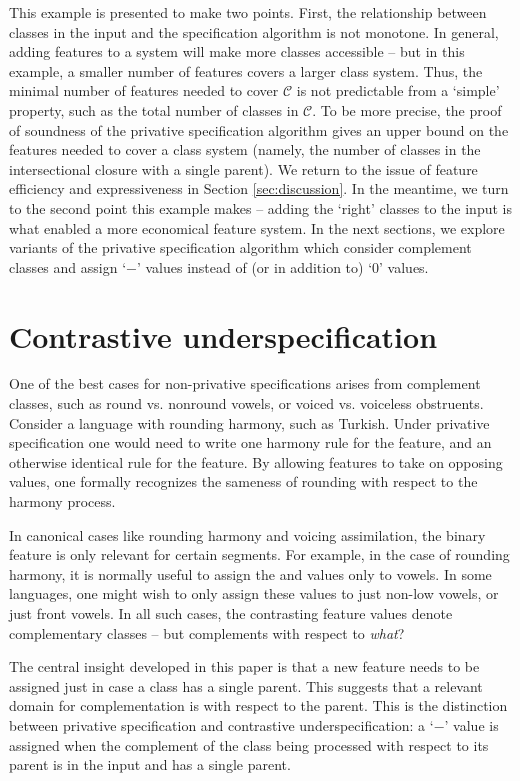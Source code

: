 \documentclass[11pt, oneside]{article}   	%
\begin{document}
This example is presented to make two points. First, the relationship between classes in the input and the specification algorithm is not monotone. In general, adding features to a system will make more classes accessible -- but in this example, a smaller number of features covers a larger class system. Thus, the minimal number of features needed to cover $\mathcal C$ is not predictable from a `simple' property, such as the total number of classes in $\mathcal C$. To be more precise, the proof of soundness of the privative specification algorithm gives an upper bound on the features needed to cover a class system (namely, the number of classes in the intersectional closure with a single parent). We return to the issue of feature efficiency and expressiveness in Section \ref{sec:discussion}. In the meantime, we turn to the second point this example makes -- adding the `right' classes to the input is what enabled a more economical feature system. In the next sections, we explore variants of the privative specification algorithm which consider complement classes and assign `$-$' values instead of (or in addition to) `$0$' values. 

\FloatBarrier
\section{Contrastive underspecification}
\label{sec:contrastiveunder}

One of the best cases for non-privative specifications arises from complement classes, such as round vs. nonround vowels, or voiced vs. voiceless obstruents. Consider a language with rounding harmony, such as Turkish. Under privative specification one would need to write one harmony rule for the  feature, and an otherwise identical rule for the  feature. By allowing features to take on opposing values, one formally recognizes the sameness of rounding with respect to the harmony process.

In canonical cases like rounding harmony and voicing assimilation, the binary feature is only relevant for certain segments. For example, in the case of rounding harmony, it is normally useful to assign the  and  values only to vowels. In some languages, one might wish to only assign these values to just non-low vowels, or just front vowels. In all such cases, the contrasting feature values denote complementary classes -- but complements with respect to \textit{what}?

The central insight developed in this paper is that a new feature needs to be assigned just in case a class has a single parent. This suggests that a relevant domain for complementation is with respect to the parent. This is the distinction between privative specification and contrastive underspecification: a `$-$' value is assigned when the complement of the class being processed with respect to its parent is in the input and has a single parent.
\end{document}
